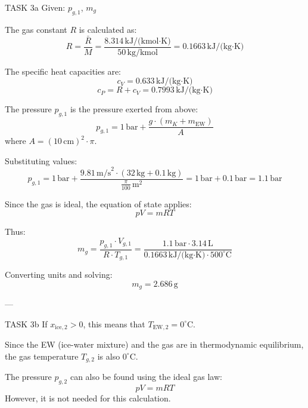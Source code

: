 TASK 3a  
Given: \( p_{g,1} \), \( m_g \)  

The gas constant \( R \) is calculated as:  
\[
R = \frac{\bar{R}}{M} = \frac{8.314 \, \text{kJ/(kmol·K)}}{50 \, \text{kg/kmol}} = 0.1663 \, \text{kJ/(kg·K)}
\]  

The specific heat capacities are:  
\[
c_V = 0.633 \, \text{kJ/(kg·K)}  
\]  
\[
c_P = R + c_V = 0.7993 \, \text{kJ/(kg·K)}
\]  

The pressure \( p_{g,1} \) is the pressure exerted from above:  
\[
p_{g,1} = 1 \, \text{bar} + \frac{g \cdot (m_K + m_{\text{EW}})}{A}
\]  
where \( A = (10 \, \text{cm})^2 \cdot \pi \).  

Substituting values:  
\[
p_{g,1} = 1 \, \text{bar} + \frac{9.81 \, \text{m/s}^2 \cdot (32 \, \text{kg} + 0.1 \, \text{kg})}{\frac{\pi}{100} \, \text{m}^2} = 1 \, \text{bar} + 0.1 \, \text{bar} = 1.1 \, \text{bar}
\]  

Since the gas is ideal, the equation of state applies:  
\[
pV = mRT
\]  

Thus:  
\[
m_g = \frac{p_{g,1} \cdot V_{g,1}}{R \cdot T_{g,1}} = \frac{1.1 \, \text{bar} \cdot 3.14 \, \text{L}}{0.1663 \, \text{kJ/(kg·K)} \cdot 500^\circ\text{C}}
\]  

Converting units and solving:  
\[
m_g = 2.686 \, \text{g}
\]  

---

TASK 3b  
If \( x_{\text{ice},2} > 0 \), this means that \( T_{\text{EW},2} = 0^\circ\text{C} \).  

Since the EW (ice-water mixture) and the gas are in thermodynamic equilibrium, the gas temperature \( T_{g,2} \) is also \( 0^\circ\text{C} \).  

The pressure \( p_{g,2} \) can also be found using the ideal gas law:  
\[
pV = mRT
\]  
However, it is not needed for this calculation.
